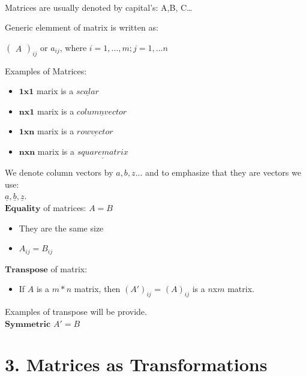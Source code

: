 \documentclass[]{article}
\providecommand{\tightlist}{%
  \setlength{\itemsep}{0pt}\setlength{\parskip}{0pt}}
\begin{document}
~

Matrices are usually denoted by capital's: A,B, C\ldots{}

Generic elemment of matrix is written as:

\begin{center}
$\begin{pmatrix}A\end{pmatrix}_{ij}$ or $a_{ij}$, where  $i=1,...,m ; j=1,...n$
\end{center}

Examples of Matrices:

\begin{itemize}
\item
  \(\mathbf{1x1}\) marix is a \(\underline{scalar}\)
\item
  \(\mathbf{nx1}\) marix is a \(\underline{column vector}\)
\item
  \(\mathbf{1xn}\) marix is a \(\underline{row vector}\)
\item
  \(\mathbf{nxn}\) marix is a \(\underline{square matrix}\)
\end{itemize}

We denote column vectors by \(a, b, z...\) and to emphasize that they
are vectors we use:\\
 \(\underline{a}, \underline{b}, \underline{z}\).\\

\(\mathbf{Equality}\) of matrices: \(A=B\)

\begin{itemize}
\tightlist
\item
  They are the same size
\item
  \(A_{ij}=B_{ij}\)
\end{itemize}

\(\mathbf{Transpose}\) of matrix:

\begin{itemize}
\tightlist
\item
  If \(A\) is a \(m*n\) matrix, then \((A')_{ij}\) = \((A)_{ij}\) is a
  \(n\)x\(m\) matrix.\\
\end{itemize}

Examples of transpose will be provide.\\

\(\mathbf{Symmetric}\) \(A'=B\)\\

\section{3. Matrices as
Transformations}\label{matrices-as-transformations-1}
\end{document}
